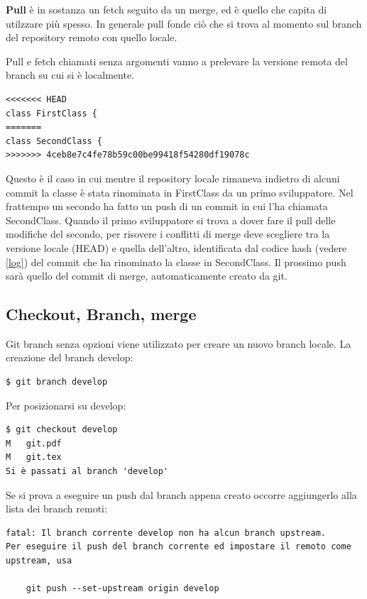 \documentclass{article} \usepackage[textwidth=18cm,textheight=18cm]{geometry}
\begin{document}
\textbf{Pull} è in sostanza un fetch seguito da un merge, ed è quello che capita di
utilzzare più spesso. In generale pull fonde ciò che si trova al momento sul
branch del repository remoto con quello locale.

Pull e fetch chiamati senza argomenti vanno a prelevare la versione remota del
branch su cui si è localmente.

\begin{verbatim}
<<<<<<< HEAD
class FirstClass {
=======
class SecondClass {
>>>>>>> 4ceb8e7c4fe78b59c00be99418f54280df19078c
\end{verbatim}

Questo è il caso in cui mentre il repository locale rimaneva indietro di alcuni
commit la classe è stata rinominata in FirstClass da un primo sviluppatore. Nel
frattempo un secondo ha fatto un push di un commit in cui l'ha chiamata
SecondClass. Quando il primo sviluppatore si trova a dover fare il pull delle modifiche del
secondo, per risovere i conflitti di merge deve scegliere tra la versione locale
(HEAD) e quella dell'altro, identificata dal codice hash (vedere \ref{log}) del commit che ha
rinominato la classe in SecondClass. Il prossimo push sarà quello del commit di
merge, automaticamente creato da git.

\subsection{Checkout, Branch, merge}

Git branch senza opzioni viene utilizzato per creare un nuovo branch locale. La
creazione del branch develop:

\begin{verbatim}
$ git branch develop
\end{verbatim}

Per posizionarsi su develop:

\begin{verbatim}
$ git checkout develop
M	git.pdf
M	git.tex
Si è passati al branch 'develop'
\end{verbatim}

Se si prova a eseguire un push dal branch appena creato occorre
aggiungerlo alla lista dei branch remoti:

\begin{verbatim}
fatal: Il branch corrente develop non ha alcun branch upstream.
Per eseguire il push del branch corrente ed impostare il remoto come upstream, usa

    git push --set-upstream origin develop
\end{verbatim}
\end{document}
